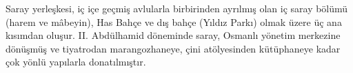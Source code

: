 \indent Saray yerleşkesi, iç içe geçmiş avlularla birbirinden ayrılmış olan iç saray bölümü (harem ve mâbeyin), Has Bahçe ve dış bahçe (Yıldız Parkı) olmak üzere üç ana kısımdan oluşur. II. Abdülhamid döneminde saray, Osmanlı yönetim merkezine dönüşmüş ve tiyatrodan marangozhaneye, çini atölyesinden kütüphaneye kadar çok yönlü yapılarla donatılmıştır.